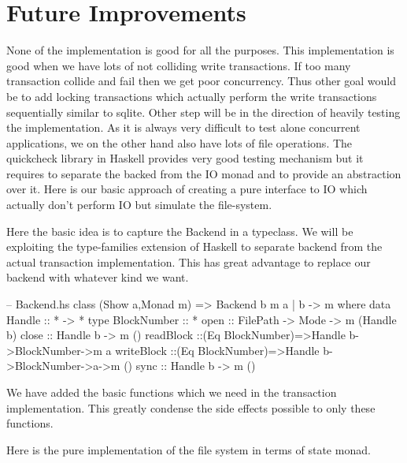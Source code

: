 \documentclass[11pt,a4paper]{article}
\begin{document}
\section{Future Improvements}
None of the implementation is good for all the purposes. This implementation is good when we have lots of not colliding write transactions. If too many transaction collide and fail then we get poor concurrency. Thus other goal would be to add locking transactions which actually perform the write transactions sequentially similar to sqlite. 
Other step will be in the direction of heavily testing the implementation. As it is always very difficult to test alone concurrent applications, we on the other hand also have lots of file operations. The quickcheck library in Haskell provides very good testing mechanism but it requires to separate the backed from the IO monad and to provide an abstraction over it.
Here is our basic approach of creating a pure interface to IO which actually don't perform IO but simulate the file-system. 

Here the basic idea is to capture the Backend in a typeclass. We will be exploiting the type-families extension of Haskell to separate backend from the actual transaction implementation. This has great advantage to replace our backend with whatever kind we want.

\begin{code}[name=Backend,firstnumber=1]
-- Backend.hs
class (Show a,Monad m) => Backend b m a | b -> m where 
    data Handle :: * -> * 
    type BlockNumber :: *  
    open :: FilePath -> Mode -> m (Handle b)
    close :: Handle b -> m () 
    readBlock ::(Eq BlockNumber)=>Handle b->BlockNumber->m a 
    writeBlock ::(Eq BlockNumber)=>Handle b->BlockNumber->a->m ()
    sync :: Handle b -> m ()
\end{code}

We have added the basic functions which we need in the transaction implementation. This greatly condense the side effects possible to only these functions.

Here is the pure implementation of the file system in terms of state monad. 

\end{document}
